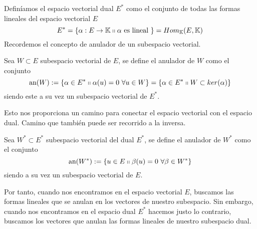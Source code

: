 Definíamos el espacio vectorial dual $E^*$ como el conjunto de todas las formas lineales del espacio vectorial $E$
\begin{equation}
	E^*=\{\alpha:E\rightarrow \mathbb{K}\shortparallel \alpha \text{ es lineal }\}=Hom_{\mathbb{K}}(E,\mathbb{K})
\end{equation}
Recordemos el concepto de anulador de un subespacio vectorial.
\begin{defi}[Anulador]
	Sea $W\subset E$ subespacio vectorial de $E$, se define el anulador de $W$ como el conjunto
	\begin{equation}
		\text{an}(W):=\{\alpha\in E^*\shortparallel \alpha(u)=0 \ \forall u\in W\}=\{\alpha\in E^*\shortparallel W\subset ker(\alpha)\}
	\end{equation}
	siendo este a su vez un subespacio vectorial de $E^*$.
\end{defi}
Esto nos proporciona un camino para conectar el espacio vectorial con el espacio dual. Camino que también puede ser recorrido a la inversa.
\begin{defi}
	Sea $W^*\subset E^*$ subespacio vectorial del dual $E^*$, se define el anulador de $W^*$ como el conjunto
	\begin{equation}
		\text{an}(W^*):=\{u\in E\shortparallel \beta(u)=0 \ \forall \beta\in W^*\}
	\end{equation}
	siendo a su vez un subespacio vectorial de $E$.
\end{defi}
Por tanto, cuando nos encontramos en el espacio vectorial $E$, buscamos las formas lineales que se anulan en los vectores de nuestro subespacio. Sin embargo, cuando nos encontramos en el espacio dual $E^*$ hacemos justo lo contrario, buscamos los vectores que anulan las formas lineales de nuestro subespacio dual. 

